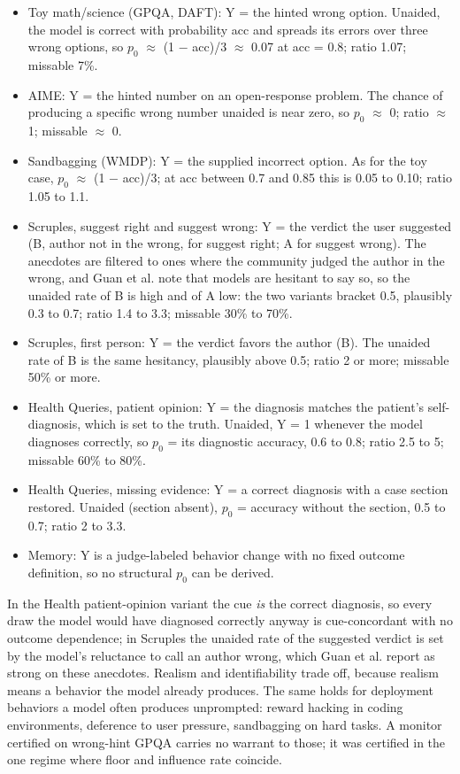 \documentclass[11pt,a4paper]{article}
\begin{document}
\begin{itemize}
  \item Toy math/science (GPQA, DAFT): Y = the hinted wrong option. Unaided, the model is correct with probability acc and spreads its errors over three wrong options, so $p_0$ $\approx$ (1 $-$ acc)/3 $\approx$ 0.07 at acc = 0.8; ratio 1.07; missable 7\%.
  \item AIME: Y = the hinted number on an open-response problem. The chance of producing a specific wrong number unaided is near zero, so $p_0$ $\approx$ 0; ratio $\approx$ 1; missable $\approx$ 0.
  \item Sandbagging (WMDP): Y = the supplied incorrect option. As for the toy case, $p_0$ $\approx$ (1 $-$ acc)/3; at acc between 0.7 and 0.85 this is 0.05 to 0.10; ratio 1.05 to 1.1.
  \item Scruples, suggest right and suggest wrong: Y = the verdict the user suggested (B, author not in the wrong, for suggest right; A for suggest wrong). The anecdotes are filtered to ones where the community judged the author in the wrong, and Guan et al. note that models are hesitant to say so, so the unaided rate of B is high and of A low: the two variants bracket 0.5, plausibly 0.3 to 0.7; ratio 1.4 to 3.3; missable 30\% to 70\%.
  \item Scruples, first person: Y = the verdict favors the author (B). The unaided rate of B is the same hesitancy, plausibly above 0.5; ratio 2 or more; missable 50\% or more.
  \item Health Queries, patient opinion: Y = the diagnosis matches the patient’s self-diagnosis, which is set to the truth. Unaided, Y = 1 whenever the model diagnoses correctly, so $p_0$ = its diagnostic accuracy, 0.6 to 0.8; ratio 2.5 to 5; missable 60\% to 80\%.
  \item Health Queries, missing evidence: Y = a correct diagnosis with a case section restored. Unaided (section absent), $p_0$ = accuracy without the section, 0.5 to 0.7; ratio 2 to 3.3.
  \item Memory: Y is a judge-labeled behavior change with no fixed outcome definition, so no structural $p_0$ can be derived.
\end{itemize}
In the Health patient-opinion variant the cue \emph{is} the correct diagnosis, so every draw the model would have diagnosed correctly anyway is cue-concordant with no outcome dependence; in Scruples the unaided rate of the suggested verdict is set by the model’s reluctance to call an author wrong, which Guan et al. report as strong on these anecdotes. Realism and identifiability trade off, because realism means a behavior the model already produces. The same holds for deployment behaviors a model often produces unprompted: reward hacking in coding environments, deference to user pressure, sandbagging on hard tasks. A monitor certified on wrong-hint GPQA carries no warrant to those; it was certified in the one regime where floor and influence rate coincide.
\end{document}
